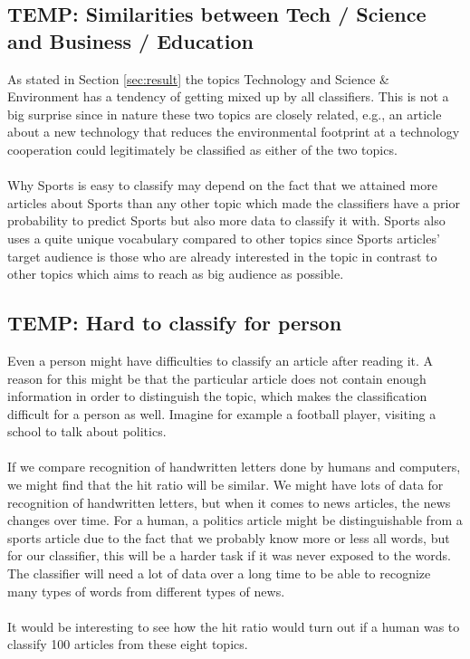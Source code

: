 \subsection{TEMP: Similarities between Tech / Science and Business / Education} %
\label{sub:temp_similarities_between_tech_science_and_business_education}
As stated in Section \ref{sec:result} the topics Technology and Science \& Environment has a tendency of getting mixed up by all classifiers. This is not a big surprise since in nature these two topics are closely related, e.g., an article about a new technology that reduces the environmental footprint at a technology cooperation could legitimately be classified as either of the two topics.\\\\
Why Sports is easy to classify may depend on the fact that we attained more articles about Sports than any other topic which made the classifiers have a prior probability to predict Sports but also more data to classify it with. Sports also uses a quite unique vocabulary compared to other topics since Sports articles' target audience is those who are already interested in the topic in contrast to other topics which aims to reach as big audience as possible.

\subsection{TEMP: Hard to classify for person} %
\label{sub:temp_hard_to_classify_for_person}
Even a person might have difficulties to classify an article after reading it. A reason for this might be that the particular article does not contain enough information in order to distinguish the topic, which makes the classification difficult for a person as well. Imagine for example a football player, visiting a school to talk about politics.
\\\\
If we compare recognition of handwritten letters done by humans and computers, we might find that the hit ratio will be similar. We might have lots of data for recognition of handwritten letters, but when it comes to news articles, the news changes over time. For a human, a politics article might be distinguishable from a sports article due to the fact that we probably know more or less all words, but for our classifier, this will be a harder task if it was never exposed to the words. The classifier will need a lot of data over a long time to be able to recognize many types of words from different types of news.
\\\\
It would be interesting to see how the hit ratio would turn out if a human was to classify 100 articles from these eight topics. 
